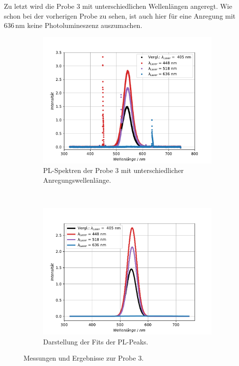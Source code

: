 Zu letzt wird die Probe 3 mit unterschiedlichen Wellenl\"{a}ngen angeregt.
Wie schon bei der vorherigen Probe zu sehen, ist auch hier f\"{u}r eine Anregung mit $636 \, \text{nm}$ keine Photolumineszenz auszumachen.
\begin{figure}[hbtp]
\centering
	\begin{subfigure}[t]{0.45\textwidth}
	\includegraphics[width=\textwidth]{Plots/aufgabe2P3.pdf}
	\caption{PL-Spektren der Probe 3 mit unterschiedlicher Anregungswellenl\"{a}nge.}
	\label{abb:auf2p3a}
	\end{subfigure}
	~
	\begin{subfigure}[t]{0.45\textwidth}
	\includegraphics[width=\textwidth]{Plots/aufgabe2P3_fit_1s.pdf}
	\caption{Darstellung der Fits der PL-Peaks.}
	\label{abb:auf2p3b}
	\end{subfigure}
\caption{Messungen und Ergebnisse zur Probe 3.}
\label{abb:auf2P3}
\end{figure}

